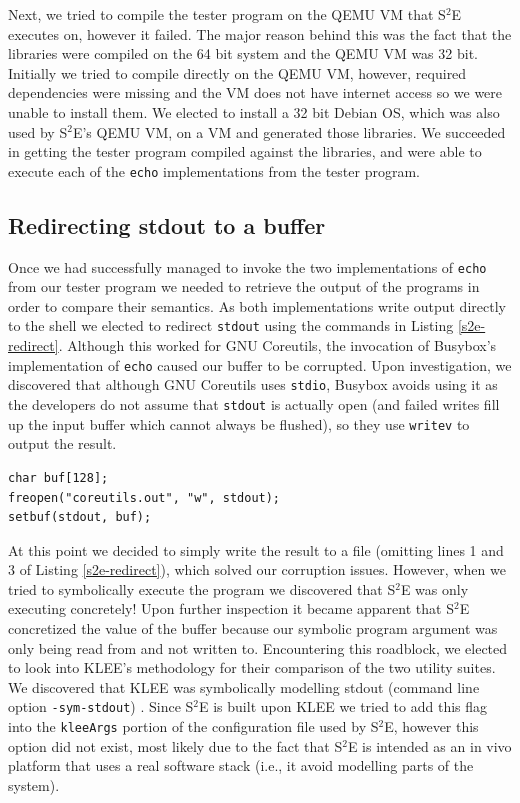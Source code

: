 \documentclass[conference]{IEEEtran}
\begin{document}
Next, we tried to compile the tester program on the QEMU VM that S$^2$E executes on, however it failed. The major reason behind this was the fact that the libraries were compiled on the 64 bit system and the QEMU VM was 32 bit. Initially we tried to compile directly on the QEMU VM, however,  required dependencies were missing and the VM does not have internet access so we were unable to install them. We elected to install a 32 bit Debian OS, which was also used by S$^2$E's QEMU VM,  on a VM and generated those libraries. We succeeded in getting the tester program compiled against the libraries, and were able to execute each of the {\tt echo} implementations from the tester program.

\subsection{Redirecting stdout to a buffer}

Once we had successfully managed to invoke the two implementations of {\tt echo} from our tester program we needed to retrieve the output of the programs in order to compare their semantics. As both implementations write output directly to the shell we elected to redirect {\tt stdout} using the commands in Listing \ref{s2e-redirect}. Although this worked for GNU Coreutils, the invocation of Busybox's implementation of {\tt echo} caused our buffer to be corrupted. Upon investigation, we discovered that although GNU Coreutils uses {\tt stdio}, Busybox avoids using it as the developers do not assume that {\tt stdout} is actually open (and failed writes fill up the input buffer which cannot always be flushed), so they use {\tt writev} to output the result. \\ 

\begin{lstlisting}[style=C, label=s2e-redirect, abovecaptionskip=2ex, captionpos=b, caption={Code snippet for redirecting stdout to a buffer}]
char buf[128];
freopen("coreutils.out", "w", stdout);
setbuf(stdout, buf);
\end{lstlisting}

At this point we decided to simply write the result to a file (omitting lines 1 and 3 of Listing \ref{s2e-redirect}), which solved our corruption issues. However, when we tried to symbolically execute the program we discovered that S$^2$E was only executing concretely! Upon further inspection it became apparent that S$^2$E concretized the value of the buffer because our symbolic program argument was only being read from and not written to. Encountering this roadblock, we elected to look into KLEE's methodology for their comparison of the two utility suites. We discovered that KLEE was symbolically modelling stdout (command line option {\tt -sym-stdout}) \cite{klee-coreutils}. Since S$^2$E is built upon KLEE we tried to add this flag into the {\tt kleeArgs} portion of the configuration file used by S$^2$E, however this option did not exist, most likely due to the fact that S$^2$E is intended as an in vivo platform that uses a real software stack (i.e., it avoid modelling parts of the system).
\end{document}
